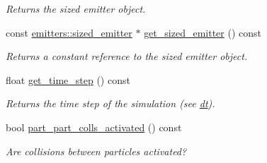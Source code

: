 \begin{DoxyCompactItemize}
\begin{DoxyCompactList}\small\item\em Returns the sized emitter object. \end{DoxyCompactList}\item 
\mbox{\label{classphysim_1_1simulator_af2d5db9f6b27dfc7ff090d97e90d9445}} 
const \hyperlink{classphysim_1_1emitters_1_1sized__emitter}{emitters\+::sized\+\_\+emitter} $\ast$ \hyperlink{classphysim_1_1simulator_af2d5db9f6b27dfc7ff090d97e90d9445}{get\+\_\+sized\+\_\+emitter} () const
\begin{DoxyCompactList}\small\item\em Returns a constant reference to the sized emitter object. \end{DoxyCompactList}\item 
\mbox{\label{classphysim_1_1simulator_a37d5c3adc5e003ab046cc3624e12b6fb}} 
float \hyperlink{classphysim_1_1simulator_a37d5c3adc5e003ab046cc3624e12b6fb}{get\+\_\+time\+\_\+step} () const
\begin{DoxyCompactList}\small\item\em Returns the time step of the simulation (see \hyperlink{classphysim_1_1simulator_a12a60d0ed819937b51ce50162dbdd6e1}{dt}). \end{DoxyCompactList}\item 
bool \hyperlink{classphysim_1_1simulator_ab36133b4fa2b4fb2d8f297f6a7dda497}{part\+\_\+part\+\_\+colls\+\_\+activated} () const
\begin{DoxyCompactList}\small\item\em Are collisions between particles activated? \end{DoxyCompactList}\end{DoxyCompactItemize}
